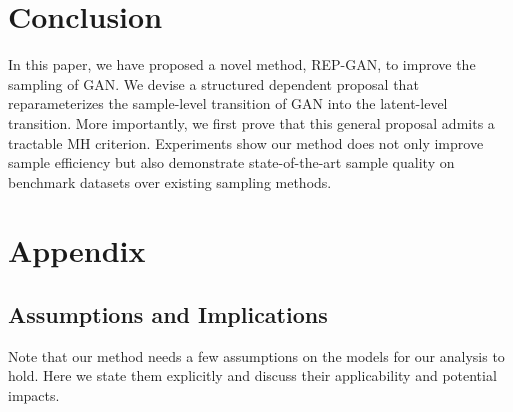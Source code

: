 \documentclass{article} %
\newcommand{\<}{\left\langle}
\renewcommand{\>}{\right\rangle}
\begin{document}


\section{Conclusion}
In this paper, we have proposed a novel method, REP-GAN, to improve the sampling of GAN. We devise a structured dependent proposal that reparameterizes the sample-level transition of GAN into the latent-level transition. More importantly, we first prove that this general proposal admits a tractable MH criterion. 
Experiments show our method does not only improve sample efficiency but also demonstrate state-of-the-art sample quality on benchmark datasets over existing sampling methods.




\newpage
\appendix
\section{Appendix}

\subsection{Assumptions and Implications}

Note that our method needs a few assumptions on the models for our analysis to hold. Here we state them explicitly and discuss their applicability and potential impacts.
\end{document}
